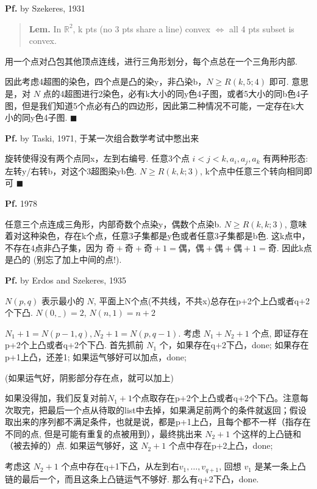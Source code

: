 \textbf{Pf.} by Szekeres, 1931

\begin{quotation}
\textbf{Lem.} In $\mathbb{R}^2$, k pts (no 3 pts share a line) convex $\iff$ all 4 pts subset is convex.
\end{quotation}

用一个点对凸包其他顶点连线，进行三角形划分，每个点总在一个三角形内部.

因此考虑4超图的染色，四个点是凸的染y，非凸染b，$N\geq R(k,5;4)$ 即可. 意思是，对 $N$ 点的4超图进行2染色，必有k大小的同y色4子图，或者5大小的同b色4子图，但是我们知道5个点必有凸的四边形，因此第二种情况不可能，一定存在k大小的同y色4子图. $\blacksquare$

\textbf{Pf.} by Taski, 1971, 于某一次组合数学考试中憋出来

旋转使得没有两个点同x，左到右编号. 任意3个点 $i<j<k,a_i,a_j,a_k$ 有两种形态: 左转y/右转b，对这个3超图染yb色. $N\geq R(k,k;3)$, k个点中任意三个转向相同即可 $\blacksquare$

\textbf{Pf.} 1978

任意三个点连成三角形，内部奇数个点染y，偶数个点染b. $N\geq R(k,k;3)$, 意味着对这种染色，存在k个点，任意3子集都是y色或者任意3子集都是b色. 这k点中，不存在4点非凸子集，因为 $\text{奇}+\text{奇}+\text{奇}+1=\text{偶}$，$\text{偶}+\text{偶}+\text{偶}+1=\text{奇}$. 因此k点是凸的 (别忘了加上中间的点!).

\textbf{Pf.} by Erdos and Szekeres, 1935


$N(p,q)$ 表示最小的 $N$, 平面上N个点(不共线，不共x)总存在p+2个上凸或者q+2个下凸. $N(0,\_)=2$, $N(n,1)=n+2$

$N_1+1=N(p-1,q),N_2+1=N(p,q-1)$. 考虑 $N_1+N_2+1$ 个点, 即证存在p+2个上凸或者q+2个下凸. 首先抓前 $N_1$ 个，如果存在q+2下凸，done; 如果存在p+1上凸，还差1; 如果运气够好可以加点，done;

(如果运气好，阴影部分存在点，就可以加上)


如果没得加，我们反复对前$N_1+1$个点取存在p+2个上凸或者q+2个下凸。注意每次取完，把最后一个点从待取的list中去掉，如果满足前两个的条件就返回；假设取出来的序列都不满足条件，也就是说，都是p+1上凸，且每个都不一样（指存在不同的点, 但是可能有重复的点被用到），最终挑出来 $N_2+1$ 个这样的上凸链和（被去掉的）点. 如果运气够好，这 $N_2+1$ 个点中存在p+2上凸，done;

考虑这 $N_2+1$ 个点中存在q+1下凸，从左到右$v_1,\dots,v_{q+1}$, 回想 $v_1$ 是某一条上凸链的最后一个，而且这条上凸链运气不够好. 那么有q+2下凸，done.


